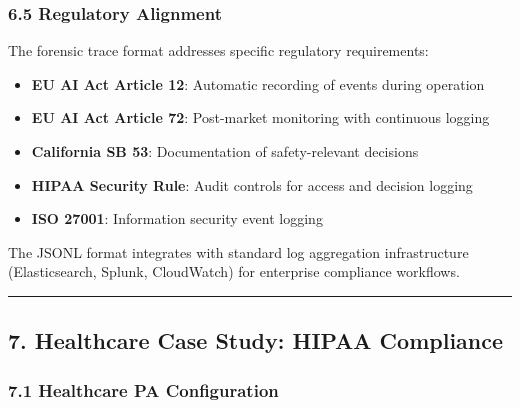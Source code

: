 \subsubsection{6.5 Regulatory Alignment}\label{regulatory-alignment}

The forensic trace format addresses specific regulatory requirements:

\begin{itemize}
\tightlist
\item
  \textbf{EU AI Act Article 12}: Automatic recording of events during
  operation
\item
  \textbf{EU AI Act Article 72}: Post-market monitoring with continuous
  logging
\item
  \textbf{California SB 53}: Documentation of safety-relevant decisions
\item
  \textbf{HIPAA Security Rule}: Audit controls for access and decision
  logging
\item
  \textbf{ISO 27001}: Information security event logging
\end{itemize}

The JSONL format integrates with standard log aggregation infrastructure
(Elasticsearch, Splunk, CloudWatch) for enterprise compliance workflows.

\begin{center}\rule{0.5\linewidth}{0.5pt}\end{center}

\subsection{7. Healthcare Case Study: HIPAA
Compliance}\label{healthcare-case-study-hipaa-compliance}

\subsubsection{7.1 Healthcare PA
Configuration}\label{healthcare-pa-configuration}

\begin{Shaded}
\begin{Highlighting}[]
\FunctionTok{\{}
  \FunctionTok{:} \FunctionTok{,}
  \FunctionTok{:} \OtherTok{[}
    \OtherTok{,}
    \OtherTok{,}
  \OtherTok{]}\FunctionTok{,}
  \FunctionTok{:} 
\FunctionTok{\}}
\end{Highlighting}
\end{Shaded}

